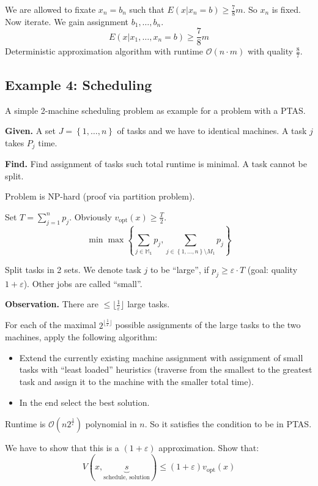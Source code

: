 \documentclass[a4paper]{article}
\newcommand{\given}[1]{\textbf{Given.} #1\par}
\newcommand{\find}[1]{\textbf{Find.} #1\par}
\newcommand{\cls}[1]{\rm{#1}}
\newcommand{\set}[1]{\left\{#1\right\}}
\newenvironment{spec}[0]{\begin{framed}}{\end{framed}}
\begin{document}
We are allowed to fixate $x_n = b_n$ such that $E(x | x_n = b) \geq \frac78m$.
So $x_n$ is fixed. Now iterate. We gain assignment $b_1, \ldots, b_n$.
\[
  E(x | x_1, \ldots, x_n = b) \geq \frac78m
\]
Deterministic approximation algorithm with runtime $\mathcal{O}(n\cdot m)$
with quality $\frac87$.

\subsection{Example 4: Scheduling}
\label{sec:scheduling}
%
A simple 2-machine scheduling problem as example for a problem with a PTAS.

\begin{spec}
  \given{
    A set $J = \set{1, \ldots, n}$ of tasks and we have to identical machines.
    A task $j$ takes $P_j$ time.
  }
  \find{Find assignment of tasks such total runtime is minimal. A task cannot be split.}
\end{spec}

Problem is \cls{NP}-hard (proof via partition problem).

Set $T = \sum_{j=1}^n p_j$. Obviously $v_{\text{opt}}(x) \geq \frac{T}{2}$.
\[
  \min\max\set{\sum_{j \in \mathbb{M_1}} p_j,
               \sum_{j \in \set{1, \ldots, n} \setminus M_1} p_j}
\]

 Split tasks in 2 sets. We denote task $j$ to be ``large'', if
$p_j \geq \varepsilon \cdot T$ (goal: quality $1 + \varepsilon$).
Other jobs are called ``small''.

\textbf{Observation.}
  There are $\leq \lfloor \frac1{\varepsilon} \rfloor$ large tasks.

For each of the maximal $2^{\lfloor \frac1{\varepsilon} \rfloor}$ possible
assignments of the large tasks to the two machines, apply the following algorithm:
\begin{itemize}
  \item Extend the currently existing machine assignment with assignment of
        small tasks with ``least loaded'' heuristics
        (traverse from the smallest to the greatest task and assign it to
        the machine with the smaller total time).
  \item In the end select the best solution.
\end{itemize}

Runtime is $\mathcal{O}(n 2^{\frac1{\varepsilon}})$ polynomial in $n$.
So it satisfies the condition to be in PTAS.

We have to show that this is a $(1 + \varepsilon)$ approximation. Show that:
\[
  V(x, \underbrace{s}_{\text{schedule, solution}})
    \leq (1 + \varepsilon) v_{\text{opt}}(x)
\]
\end{document}
